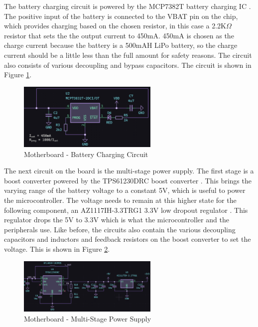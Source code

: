 \documentclass[12pt]{article}
\begin{document}
    The battery charging circuit is powered by the MCP7382T battery charging IC \cite{mcp73832}. The positive input of the battery is connected to the VBAT pin on the chip, which provides charging based on the chosen resistor, in this case a 2.2K$\Omega$ resistor that sets the the output current to 450mA. 450mA is chosen as the charge current because the battery is a 500mAH LiPo battery, so the charge current should be a little less than the full amount for safety reasons. The circuit also consists of various decoupling and bypass capacitors. The circuit is shown in Figure \ref{pcb_battery}.

    \begin{figure}[hbt!]
        \centering
        \includegraphics[width=0.6\textwidth]{images/pcb_battery.png}
        \caption{Motherboard - Battery Charging Circuit}
        \label{pcb_battery}
    \end{figure}

    The next circuit on the board is the multi-stage power supply. The first stage is a boost converter powered by the TPS61230DRC boost converter \cite{boost}. This brings the varying range of the battery voltage to a constant 5V, which is useful to power the microcontroller. The voltage needs to remain at this higher state for the following component, an AZ1117IH-3.3TRG1 3.3V low dropout regulator \cite{3v3}. This regulator drops the 5V to 3.3V which is what the microcontroller and the peripherals use. Like before, the circuits also contain the various decoupling capacitors and inductors and feedback resistors on the boost converter to set the voltage. This is shown in Figure \ref{pcb_power}.

    \begin{figure}[hbt!]
        \centering
        \includegraphics[width=0.6\textwidth]{images/pcb_power.png}
        \caption{Motherboard - Multi-Stage Power Supply}
        \label{pcb_power}
    \end{figure}
\end{document}
